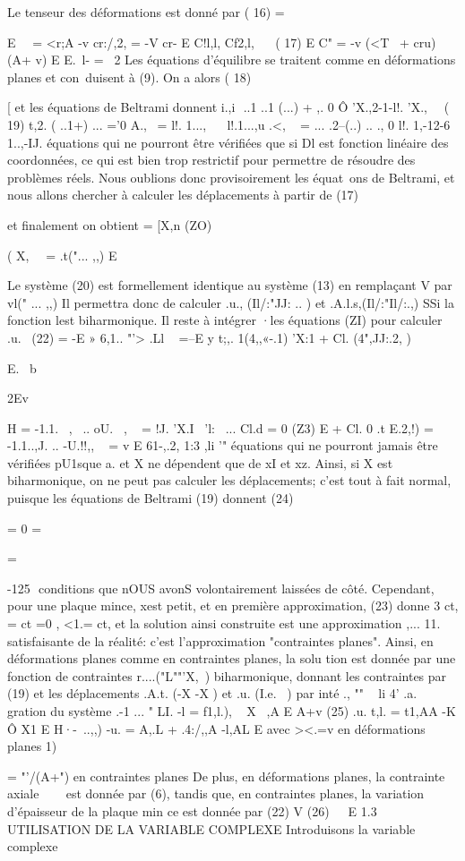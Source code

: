 {Le tenseur des déformations est donné par 
( 16) 
= 

E~~ 	= <r;A -v cr:/,2, = -V cr-
E C!l,l, 	Cf2,l, ~~ 
( 17) 
E C" = 	-v (<T~ + cru) (A+ v)
E E.~l-	= ~2­
Les équations d'équilibre se traitent comme en déformations planes et con­~duisent à (9). On a alors 
( 18) 

[ 
et les équations de Beltrami donnent i.,i  ..1 ..1 (...) + ,. 0
Ô 'X.,2-1-l!. 'X.,~~ 
( 19) t,2. ( ..1+\1) ... ='0
A.,~ = l!. 1..., ~~ l!.1...,u .<, ~ = ... .2--(..\+\1) .. ., 0
l!. 1,-12-6 1..,-IJ. 
équations qui ne pourront être vérifiées que si Dl est fonction linéaire des coordonnées, ce qui est bien trop restrictif pour permettre de résoudre des problèmes réels. Nous oublions donc provisoirement les équat~ons de Bel­trami, et nous allons chercher à calculer les déplacements à partir de (17) 

et finalement on obtient 
= [X,n 
(ZO) 

( X,~~ 
= .t("... ,,) 
E 


Le système (20) est formellement identique au système (13) en remplaçant V 
par vl(" ... ,,) Il permettra donc de calculer .u., (Il/:"JJ: .. ) et .A.l.s,(Il/:"Il/:.,) SSi la 
fonction lest biharmonique. Il reste à intégrer ·les équations (ZI) pour 
calculer .u.~ 
(22) 
= -E » 6,1.. "'> .Ll ~ =--E y t;,. 1(4,,«-.1) 'X:1 + Cl. (4",JJ:.2, ) 

E. 
~b 
{ 2Ev 



H = -1.1. ~,~ .. oU. ~, ~ = !J. 'X.I~ 'l:~ ... Cl.d = 0 
(Z3) E 
+ Cl. 0
.t E.2,!) = -1.1..,J. .. -U.!!,, ~ = v E 61-,.2, 1:3 ,li '" 
équations qui ne pourront jamais être vérifiées pU1sque a. et X ne dépendent 
que de xI et xz. Ainsi, si X est biharmonique, on ne peut pas calculer les déplacements; c'est tout à fait normal, puisque les équations de Beltrami (19) 
donnent 
(24) 

= 0
= 

= 

-125 ­
conditions que nOUS avonS volontairement laissées de côté. Cependant, pour 
une plaque mince, xest petit, et en première approximation, (23) donne
3 ct, = ct =0 , <1.= ct, et la solution ainsi construite est une approximation
,... 11. satisfaisante de la réalité: c'est l'approximation "contraintes planes". 
Ainsi, en déformations planes comme en contraintes planes, la solu­
tion est donnée par une fonction de contraintes r....("L""'X,~) biharmonique, donnant les contraintes par (19) et les déplacements .A.t. (-X -X ) et .u. (I.e. ~) par inté­
., "" ~ li 4' .a. 
gration du système 
.-1 ... " 
LI. -l{
= f1,l.), ~ X}
~,A 
E 
A+v
(25) 
.u. 
t,l. = t1,AA -K Ô X1 
E 
H·-\ ..,,)
-u. = 
A,.L + .4:/,,A -l,AL
E 
avec ><.=v en déformations planes 1){ = "'/(A+") en contraintes planes De plus, en déformations planes, la contrainte axiale ~~~ est donnée par (6), 
tandis que, en contraintes planes, la variation d'épaisseur de la plaque min­
ce est donnée par (22) 
V
(26) 
~ ­
E 
1.3 UTILISATION DE LA VARIABLE COMPLEXE 
Introduisons la variable complexe 

}}}
